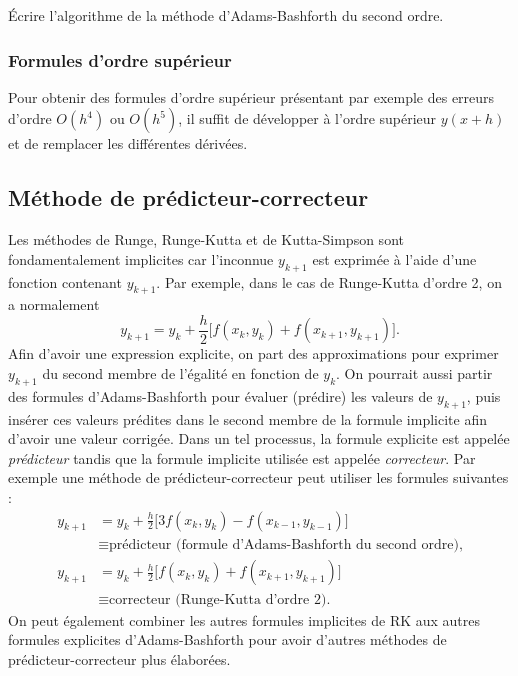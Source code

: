 \begin{exercice}
Écrire l'algorithme de la méthode d'Adams-Bashforth du second ordre.
\end{exercice}

\subsubsection{Formules d'ordre supérieur}

Pour obtenir des formules d'ordre supérieur présentant par exemple des erreurs
d'ordre $O(h^4)$ ou $O(h^5)$, il suffit de développer à l'ordre supérieur
$y(x+h)$ et de remplacer les différentes dérivées.

\subsection{Méthode de prédicteur-correcteur}

Les méthodes de Runge, Runge-Kutta et de Kutta-Simpson sont fondamentalement
implicites car l'inconnue $y_{k+1}$ est exprimée à l'aide d'une fonction
contenant $y_{k+1}$. Par exemple, dans le cas de Runge-Kutta d'ordre 2, on a
normalement
\[
  y_{k+1} = y_k + \frac{h}{2}\bigl[f(x_k, y_k) + f(x_{k+1}, y_{k+1})\bigr].
\]
Afin d'avoir une expression explicite, on part des approximations pour
exprimer $y_{k+1}$ du second membre de l'égalité en fonction de $y_k$. On
pourrait aussi partir des formules d'Adams-Bashforth pour évaluer (prédire) les
valeurs de $y_{k+1}$, puis insérer ces valeurs prédites dans le second membre
de la formule implicite afin d'avoir une valeur corrigée. Dans un tel
processus, la formule explicite est appelée \emph{prédicteur} tandis que la
formule implicite utilisée est appelée \emph{correcteur}. Par exemple une
méthode de prédicteur-correcteur peut utiliser les formules suivantes :
\begin{align*}
  y_{k+1} &= y_k + \frac{h}{2}\bigl[3f(x_k, y_k) - f(x_{k-1}, y_{k-1})\bigr]\\
          &\equiv \text{prédicteur (formule d'Adams-Bashforth du second ordre),}\\[0.6em]
  y_{k+1} &= y_k + \frac{h}{2}\bigl[f(x_k, y_k) + f(x_{k+1}, y_{k+1})\bigr]\\
          &\equiv \text{correcteur (Runge-Kutta d'ordre 2).}
\end{align*}
On peut également combiner les autres formules implicites de RK aux autres
formules explicites d'Adams-Bashforth pour avoir d'autres méthodes de
prédicteur-correcteur plus élaborées.

